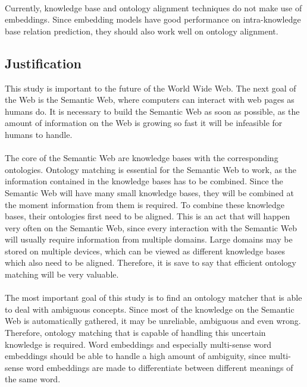 \documentclass{article}
\begin{document}
 \paragraph{}
 Currently, knowledge base and ontology alignment techniques do not make use of embeddings. Since embedding models have good performance on intra-knowledge base relation prediction, they should also work well on ontology alignment.
 
 \subsection{Justification} 
 This study is important to the future of the World Wide Web. The next goal of the Web is the Semantic Web, where computers can interact with web pages as humans do. It is necessary to build the Semantic Web as soon as possible, as the amount of information on the Web is growing so fast it will be infeasible for humans to handle\cite{overload}.
 \paragraph{}
 The core of the Semantic Web are knowledge bases with the corresponding ontologies. Ontology matching is essential for the Semantic Web to work, as the information contained in the knowledge bases has to be combined. Since the Semantic Web will have many small knowledge bases, they will be combined at the moment information from them is required. To combine these knowledge bases, their ontologies first need to be aligned. This is an act that will happen very often on the Semantic Web, since every interaction with the Semantic Web will usually require information from multiple domains. Large domains may be stored on multiple devices, which can be viewed as different knowledge bases which also need to be aligned. Therefore, it is save to say that efficient ontology matching will be very valuable.
 \paragraph{}
 The most important goal of this study is to find an ontology matcher that is able to deal with ambiguous concepts. Since most of the knowledge on the Semantic Web is automatically gathered, it may be unreliable, ambiguous and even wrong. Therefore, ontology matching that is capable of handling this uncertain knowledge is required. Word embeddings and especially multi-sense word embeddings should be able to handle a high amount of ambiguity, since multi-sense word embeddings are made to differentiate between different meanings of the same word.
\end{document}
